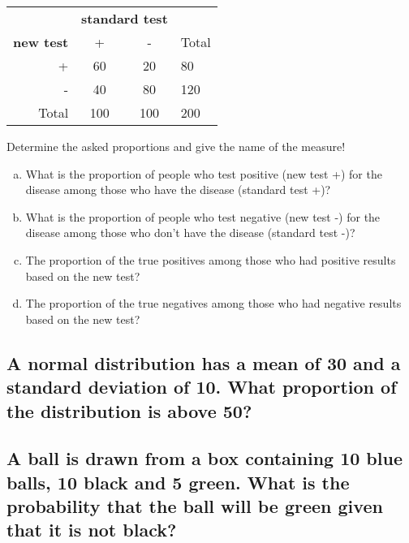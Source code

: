 \begin{center}\small
	\begin{tabular}{r|cc|l}
	\toprule
			& \multicolumn{2}{c|}{\textbf{standard test}}\\
	\textbf{new test}	& +	& -	&Total\\
	\midrule
	+ & 60 & 20 & 80\\
	- &	40 & 80 & 120\\
	\midrule
	Total	&100&100	&200\\
	\bottomrule	
	\end{tabular}
\end{center}

Determine the asked proportions and give the name of the measure!
\begin{enumerate}[a)]
\item What is the proportion of people who test positive (new test +) for the disease among those who have the disease (standard test +)?\hrulefill%


\item What is the proportion of people who test negative (new test -) for the disease among those who don't have the disease (standard test -)?
 \hrulefill%


\item The proportion of the true positives among those who had positive results based on the new test?

 \hrulefill


\item The proportion of the true negatives among those who had negative results based on the new test?

\hrulefill


\end{enumerate}

\subsection{A normal distribution has a mean of 30 and a standard deviation of 10. 
What proportion of the distribution is above 50?}
\vspace{5em}

\subsection{A ball is drawn from a box containing 10 blue balls, 10 black and 5 green. What is the probability that the ball will be green given that it is not black?}
\vfill
